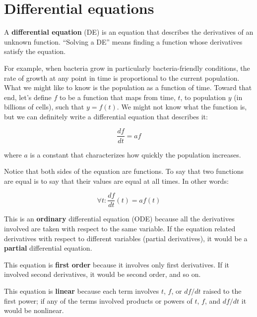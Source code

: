 \documentclass[
]{book}
\begin{document}
\section{Differential equations}

A {\bf differential equation} (DE) is an equation that describes the
derivatives of an unknown function.  ``Solving a DE'' means finding a
function whose derivatives satisfy the equation.

For example, when bacteria grow in particularly bacteria-friendly
conditions, the rate of growth at any point in time is proportional to
the current population.  What we might like to know is the population
as a function of time.  Toward that end, let's define $f$ to be a
function that maps from time, $t$, to population $y$ (in billions of cells),
such that $y = f(t)$.  We might not
know what the function is, but we can definitely write a differential equation
that describes it:

\begin{equation}\label{eq:exp_growth}
\frac{df}{dt} = a f
\end{equation}

where $a$ is a constant that characterizes how quickly the population
increases.

Notice that both sides of the equation are functions.  To say that
two functions are equal is to say that their values are equal at
all times.  In other words:

\begin{equation}
\forall t: \frac{df}{dt}(t) = a f(t)
\end{equation}

This is an {\bf ordinary} differential equation (ODE) because all the
derivatives involved are taken with respect to the
same variable.  If the equation related derivatives with respect to
different variables (partial derivatives), it would be a {\bf partial}
differential equation.

This equation is {\bf first order} because it involves only first
derivatives.  If it involved second derivatives, it would be second order,
and so on.

This equation is {\bf linear} because each term involves $t$, $f$, or
$df/dt$ raised to the first power; if any of the terms involved
products or powers of $t$, $f$, and $df/dt$ it would be
nonlinear.
\end{document}
